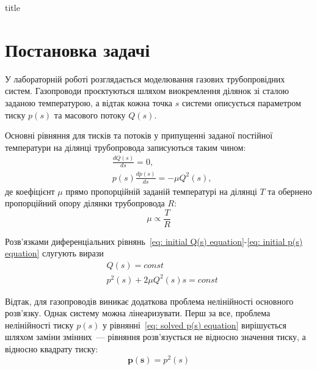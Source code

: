 \documentclass{mathreport}
\begin{document}




{title}

\tableofcontents

\newpage

\section{Постановка задачі}

У лабораторній роботі розглядається моделювання газових трубопровідних систем. Газопроводи проєктуються шляхом виокремлення ділянок зі сталою заданою температурою, а відтак кожна точка $s$ системи описується параметром тиску $p(s)$ та масового потоку $Q(s)$.  

Основні рівняння для тисків та потоків у припущенні заданої постійної температури на ділянці трубопровода записуються таким чином:
\begin{align}
    & \frac{dQ(s)}{ds} = 0, \label{eq: initial Q(s) equation} \\
    & p(s)\frac{dp(s)}{ds} = - \mu Q^2(s), \label{eq: initial p(s) equation}
\end{align}
де коефіцієнт $\mu$ прямо пропорційній заданій температурі на ділянці $T$ та обернено пропорційний опору ділянки трубопровода $R:$
\begin{equation}\label{eq: mu coefficient}
    \mu \propto \frac{T}{R} 
\end{equation}

Розв'язками диференціальних рівнянь~\eqref{eq: initial Q(s) equation}-\eqref{eq: initial p(s) equation} слугують вирази
\begin{align}
    & Q(s) = const \label{eq: solved Q(s) equation} \\
    & p^2(s) + 2\mu Q^2(s) s = const \label{eq: solved p(s) equation}
\end{align}

Відтак, для газопроводів виникає додаткова проблема нелінійності основного розв'язку. Однак систему можна лінеаризувати. Перш за все, проблема нелінійності тиску $p(s)$ у рівнянні~\eqref{eq: solved p(s) equation} вирішується шляхом заміни змінних~--- рівняння розв'язується не відносно значення тиску, а відносно квадрату тиску:
\begin{equation}\label{eq: p(s) linearization}
    \mathbf{p(s)} = p^2(s)
\end{equation}
\end{document}
